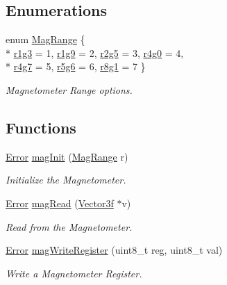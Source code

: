 \subsection*{Enumerations}
\begin{DoxyCompactItemize}
\item 
enum \hyperlink{group__mag_ga3af649d913d146d6654db2354d88c18a}{Mag\-Range} \{ \\*
\hyperlink{group__mag_gga3af649d913d146d6654db2354d88c18aa18e06791b32b1772765ff7e54d3e24fd}{r1g3} = 1, 
\hyperlink{group__mag_gga3af649d913d146d6654db2354d88c18aa8cab223a26c8b984d14dd7214ec4f5f6}{r1g9} = 2, 
\hyperlink{group__mag_gga3af649d913d146d6654db2354d88c18aa19f90e5cf717669e72908f8d8a1c9f89}{r2g5} = 3, 
\hyperlink{group__mag_gga3af649d913d146d6654db2354d88c18aa402a6d56b75bc48c8521500dd8b38bd8}{r4g0} = 4, 
\\*
\hyperlink{group__mag_gga3af649d913d146d6654db2354d88c18aaa7401534bd82cade38cbb47c0ff4223e}{r4g7} = 5, 
\hyperlink{group__mag_gga3af649d913d146d6654db2354d88c18aa815faf18742b2b13ba477eed930851f4}{r5g6} = 6, 
\hyperlink{group__mag_gga3af649d913d146d6654db2354d88c18aa1cb5526ddb90c9b33beb87c0d5ad97ee}{r8g1} = 7
 \}
\begin{DoxyCompactList}\small\item\em Magnetometer Range options. \end{DoxyCompactList}\end{DoxyCompactItemize}
\subsection*{Functions}
\begin{DoxyCompactItemize}
\item 
\hyperlink{group__error_ga2c3e4bb40f36b262a5214e2da2bca9c5}{Error} \hyperlink{group__mag_ga7e5d5e6448efb84e8805e2fbea9cb374}{mag\-Init} (\hyperlink{group__mag_ga3af649d913d146d6654db2354d88c18a}{Mag\-Range} r)
\begin{DoxyCompactList}\small\item\em Initialize the Magnetometer. \end{DoxyCompactList}\item 
\hyperlink{group__error_ga2c3e4bb40f36b262a5214e2da2bca9c5}{Error} \hyperlink{group__mag_gacc0c83a48498170ef36451db2c684abb}{mag\-Read} (\hyperlink{struct_vector3f}{Vector3f} $\ast$v)
\begin{DoxyCompactList}\small\item\em Read from the Magnetometer. \end{DoxyCompactList}\item 
\hyperlink{group__error_ga2c3e4bb40f36b262a5214e2da2bca9c5}{Error} \hyperlink{group__mag_gafaf03e3013fe2046847afc2518f23eed}{mag\-Write\-Register} (uint8\-\_\-t reg, uint8\-\_\-t val)
\begin{DoxyCompactList}\small\item\em Write a Magnetometer Register. \end{DoxyCompactList}\end{DoxyCompactItemize}

